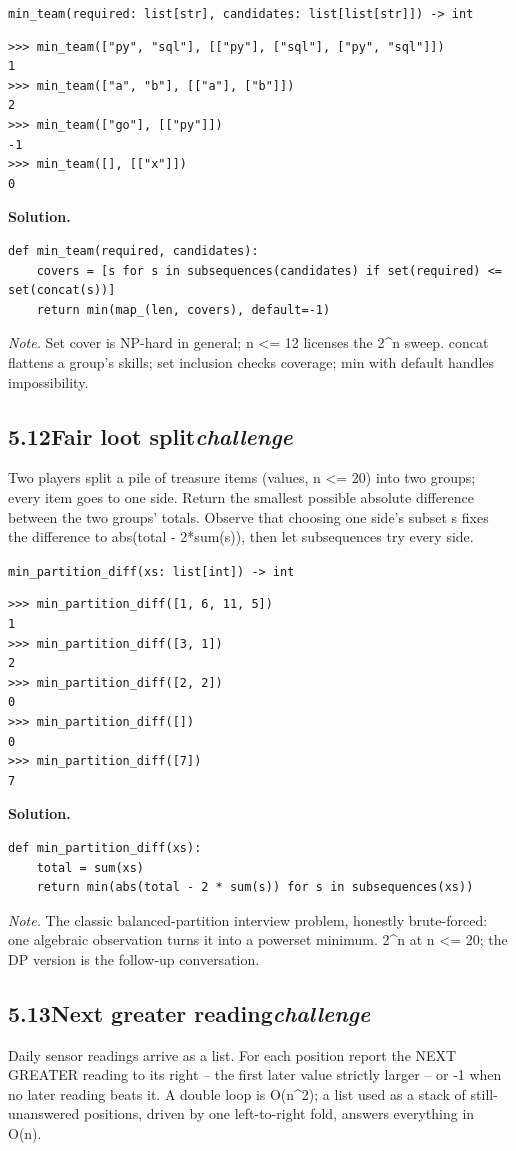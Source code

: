 \documentclass[10pt,letterpaper]{book}
\begin{document}
\noindent\texttt{min\_team(required: list[str], candidates: list[list[str]]) -> int}
\begin{lstlisting}[style=ex]
>>> min_team(["py", "sql"], [["py"], ["sql"], ["py", "sql"]])
1
>>> min_team(["a", "b"], [["a"], ["b"]])
2
>>> min_team(["go"], [["py"]])
-1
>>> min_team([], [["x"]])
0
\end{lstlisting}
\noindent\textbf{Solution.}
\begin{lstlisting}[style=code]
def min_team(required, candidates):
    covers = [s for s in subsequences(candidates) if set(required) <= set(concat(s))]
    return min(map_(len, covers), default=-1)
\end{lstlisting}
\noindent\textit{Note.} Set cover is NP-hard in general; n <= 12 licenses the 2\^{}n sweep. concat flattens a group's skills; set inclusion checks coverage; min with default handles impossibility.

\subsection*{5.12\quad Fair loot split\hfill\textnormal{\textit{challenge}}}
Two players split a pile of treasure items (values, n <= 20) into two groups; every item goes to one side. Return the smallest possible absolute difference between the two groups' totals. Observe that choosing one side's subset s fixes the difference to abs(total - 2*sum(s)), then let subsequences try every side.

\noindent\texttt{min\_partition\_diff(xs: list[int]) -> int}
\begin{lstlisting}[style=ex]
>>> min_partition_diff([1, 6, 11, 5])
1
>>> min_partition_diff([3, 1])
2
>>> min_partition_diff([2, 2])
0
>>> min_partition_diff([])
0
>>> min_partition_diff([7])
7
\end{lstlisting}
\noindent\textbf{Solution.}
\begin{lstlisting}[style=code]
def min_partition_diff(xs):
    total = sum(xs)
    return min(abs(total - 2 * sum(s)) for s in subsequences(xs))
\end{lstlisting}
\noindent\textit{Note.} The classic balanced-partition interview problem, honestly brute-forced: one algebraic observation turns it into a powerset minimum. 2\^{}n at n <= 20; the DP version is the follow-up conversation.

\subsection*{5.13\quad Next greater reading\hfill\textnormal{\textit{challenge}}}
Daily sensor readings arrive as a list. For each position report the NEXT GREATER reading to its right -- the first later value strictly larger -- or -1 when no later reading beats it. A double loop is O(n\^{}2); a list used as a stack of still-unanswered positions, driven by one left-to-right fold, answers everything in O(n).
\end{document}
